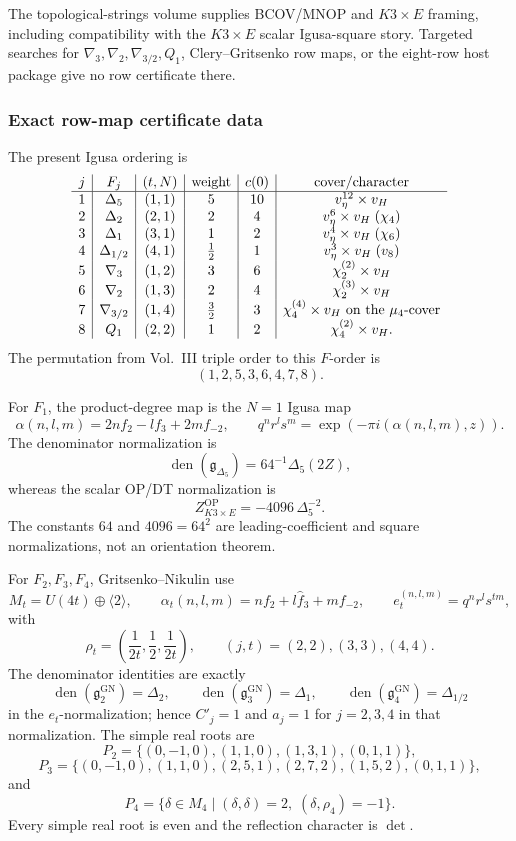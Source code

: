 The topological-strings volume supplies BCOV/MNOP and \(K3\times E\)
framing, including compatibility with the \(K3\times E\) scalar
Igusa-square story.  Targeted searches for
\(\nabla_3,\nabla_2,\nabla_{3/2},Q_1\), Clery--Gritsenko row maps, or
the eight-row host package give no row certificate there.

\subsubsection*{Exact row-map certificate data}

The present Igusa ordering is
\[
\begin{array}{c|c|c|c|c|c}
j&F_j&(t,N)&\mathrm{weight}&c(0)&\mathrm{cover/character}\\ \hline
1&\Delta_5&(1,1)&5&10&v_\eta^{12}\times v_H\\
2&\Delta_2&(2,1)&2&4&v_\eta^{6}\times v_H\;(\chi_4)\\
3&\Delta_1&(3,1)&1&2&v_\eta^{4}\times v_H\;(\chi_6)\\
4&\Delta_{1/2}&(4,1)&\tfrac12&1&
v_\eta^{3}\times v_H\;(v_8)\\
5&\nabla_3&(1,2)&3&6&\chi_2^{(2)}\times v_H\\
6&\nabla_2&(1,3)&2&4&\chi_2^{(3)}\times v_H\\
7&\nabla_{3/2}&(1,4)&\tfrac32&3&
\chi_4^{(4)}\times v_H\ \hbox{on the }\mu_4\hbox{-cover}\\
8&Q_1&(2,2)&1&2&\chi_4^{(2)}\times v_H .
\end{array}
\]
The permutation from Vol.~III triple order to this \(F\)-order is
\[
(1,2,5,3,6,4,7,8).
\]

For \(F_1\), the product-degree map is the \(N=1\) Igusa map
\[
\alpha(n,l,m)=2nf_2-lf_3+2mf_{-2},
\qquad
q^nr^ls^m=\exp(-\pi i(\alpha(n,l,m),z)).
\]
The denominator normalization is
\[
\operatorname{den}(\mathfrak g_{\Delta_5})
=64^{-1}\Delta_5(2Z),
\]
whereas the scalar OP/DT normalization is
\[
Z^{\mathrm{OP}}_{K3\times E}=-4096\,\Delta_5^{-2}.
\]
The constants \(64\) and \(4096=64^2\) are leading-coefficient and
square normalizations, not an orientation theorem.

For \(F_2,F_3,F_4\), Gritsenko--Nikulin use
\[
M_t=U(4t)\oplus\langle 2\rangle,\qquad
\alpha_t(n,l,m)=nf_2+l\widehat f_3+mf_{-2},
\qquad
e_t^{(n,l,m)}=q^nr^ls^{tm},
\]
with
\[
\rho_t=\left(\frac1{2t},\frac12,\frac1{2t}\right),
\qquad (j,t)=(2,2),(3,3),(4,4).
\]
The denominator identities are exactly
\[
\operatorname{den}(\mathfrak g^{\mathrm{GN}}_2)=\Delta_2,\qquad
\operatorname{den}(\mathfrak g^{\mathrm{GN}}_3)=\Delta_1,\qquad
\operatorname{den}(\mathfrak g^{\mathrm{GN}}_4)=\Delta_{1/2}
\]
in the \(e_t\)-normalization; hence \(C'_j=1\) and \(a_j=1\) for
\(j=2,3,4\) in that normalization.  The simple real roots are
\[
P_2=\{(0,-1,0),(1,1,0),(1,3,1),(0,1,1)\},
\]
\[
P_3=\{(0,-1,0),(1,1,0),(2,5,1),
(2,7,2),(1,5,2),(0,1,1)\},
\]
and
\[
P_4=\{\delta\in M_4\mid(\delta,\delta)=2,\;(\delta,\rho_4)=-1\}.
\]
Every simple real root is even and the reflection character is
\(\det\).

